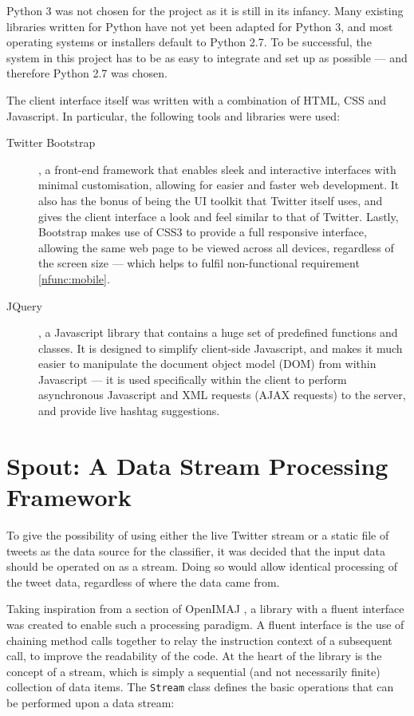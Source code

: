 \documentclass[11pt,a4paper]{report}
\begin{document}
Python 3 was not chosen for the project as it is still in its infancy. Many existing libraries written for Python have not yet been adapted for Python 3, and most operating systems or installers default to Python 2.7. To be successful, the system in this project has to be as easy to integrate and set up as possible --- and therefore Python 2.7 was chosen.

The client interface itself was written with a combination of HTML, CSS and Javascript. In particular, the following tools and libraries were used:

\begin{description}
    \item[Twitter Bootstrap\footnotemark], a front-end framework that enables sleek and interactive interfaces with minimal customisation, allowing for easier and faster web development. It also has the bonus of being the UI toolkit that Twitter itself uses, and gives the client interface a look and feel similar to that of Twitter. Lastly, Bootstrap makes use of CSS3 to provide a full responsive interface, allowing the same web page to be viewed across all devices, regardless of the screen size --- which helps to fulfil non-functional requirement \ref{nfunc:mobile}.
    \item[JQuery\footnotemark], a Javascript library that contains a huge set of predefined functions and classes. It is designed to simplify client-side Javascript, and makes it much easier to manipulate the document object model (DOM) from within Javascript --- it is used specifically within the client to perform asynchronous Javascript and XML requests (AJAX requests) to the server, and provide live hashtag suggestions.
\end{description}

\section{Spout: A Data Stream Processing Framework}
\label{sec:spout}
To give the possibility of using either the live Twitter stream or a static file of tweets as the data source for the classifier, it was decided that the input data should be operated on as a stream. Doing so would allow identical processing of the tweet data, regardless of where the data came from.

Taking inspiration from a section of OpenIMAJ \parencite{Hare:2011}, a library with a fluent interface was created to enable such a processing paradigm. A fluent interface is the use of chaining method calls together to relay the instruction context of a subsequent call, to improve the readability of the code. At the heart of the library is the concept of a stream, which is simply a sequential (and not necessarily finite) collection of data items. The \verb+Stream+ class defines the basic operations that can be performed upon a data stream:
\end{document}
